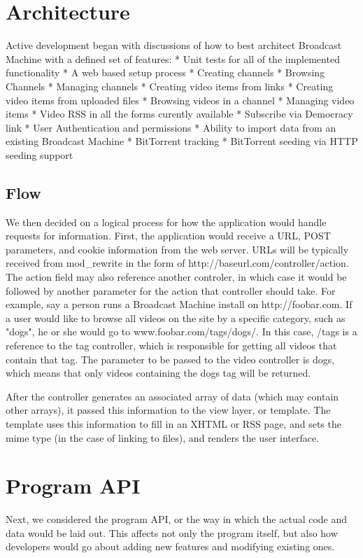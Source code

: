\documentclass[a4paper,12pt]{report}
\begin{document}
\begin{description}
\section{Architecture}
Active development began with discussions of how to best architect Broadcast Machine with a defined set of features:
  * Unit tests for all of the implemented functionality
  * A web based setup process
  * Creating channels
  * Browsing Channels
  * Managing channels
  * Creating video items from links
  * Creating video items from uploaded files
  * Browsing videos in a channel
  * Managing video items
  * Video RSS in all the forms curently available
  * Subscribe via Democracy link
  * User Authentication and permissions
  * Ability to import data from an existing Broadcast Machine
  * BitTorrent tracking
  * BitTorrent seeding via HTTP seeding support

\subsection{Flow}
We then decided on a logical process for how the application would handle requests for information. First, the application would receive a URL, POST parameters, and cookie information from the web server. URLs will be typically received from mod_rewrite in the form of http://baseurl.com/controller/action. The action field may also reference another controler, in which case it would be followed by another parameter for the action that controller should take. For example, say a person runs a Broadcast Machine install on http://foobar.com. If a user would like to browse all videos on the site by a specific category, such as "dogs", he or she would go to www.foobar.com/tags/dogs/. In this case, /tags is a reference to the tag controller, which is responsible for getting all videos that contain that tag. The parameter to be passed to the video controller is dogs, which means that only videos containing the dogs tag will be returned. 

After the controller generates an associated array of data (which may contain other arrays), it passed this information to the view layer, or template. The template uses this information to fill in an XHTML or RSS page, and sets the mime type (in the case of linking to files), and renders the user interface.

\section{Program API}
Next, we considered the program API, or the way in which the actual code and data would be laid out. This affects not only the program itself, but also how developers would go about adding new features and modifying existing ones.


\end{description}
\end{document}
